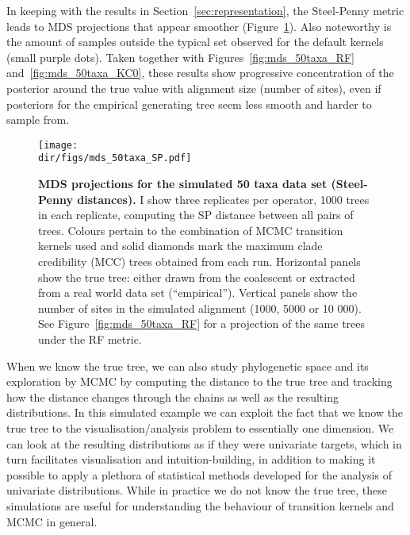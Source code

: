 In keeping with the results in Section~\ref{sec:representation}, the Steel-Penny metric leads to MDS projections that appear smoother (Figure~\ref{fig:mds_50taxa_SP}).
Also noteworthy is the amount of samples outside the typical set observed for the default kernels (small purple dots). 
Taken together with Figures~\ref{fig:mds_50taxa_RF} and~\ref{fig:mds_50taxa_KC0}, these results show progressive concentration of the posterior around the true value with alignment size (number of sites), even if posteriors for the empirical generating tree seem less smooth and harder to sample from.
\begin{figure}[!ht]
\begin{center}
\texttt{[image: \\dir/figs/mds\_50taxa\_SP.pdf]} 
\end{center}
 \caption[MDS projections for the simulated 50 taxa data set (Steel-Penny distances).]{\textbf{MDS projections for the simulated 50 taxa data set (Steel-Penny distances).}
 I show three replicates per operator, 1000 trees in each replicate, computing the SP distance between all pairs of trees.
 Colours pertain to the combination of MCMC transition kernels used and solid diamonds mark the maximum clade credibility (MCC) trees obtained from each run.
 Horizontal panels show the true tree: either drawn from the coalescent or extracted from a real world data set (``empirical'').
 Vertical panels show the number of sites in the simulated alignment (1000, 5000 or 10 000).
 See Figure~\ref{fig:mds_50taxa_RF} for a projection of the same trees under the RF metric.
 }
\label{fig:mds_50taxa_SP}
\end{figure}

When we know the true tree, we can also study phylogenetic space and its exploration by MCMC by computing the distance to the true tree and tracking how the distance changes through the chains as well as the resulting distributions.
In this simulated example we can exploit the fact that we know the true tree to the visualisation/analysis problem to essentially one dimension.
We can look at the resulting distributions as if they were univariate targets, which in turn facilitates visualisation and intuition-building, in addition to making it possible to apply a plethora of statistical methods developed for the analysis of univariate distributions.
While in practice we do not know the true tree, these simulations are useful for understanding the behaviour of transition kernels and MCMC in general. 

